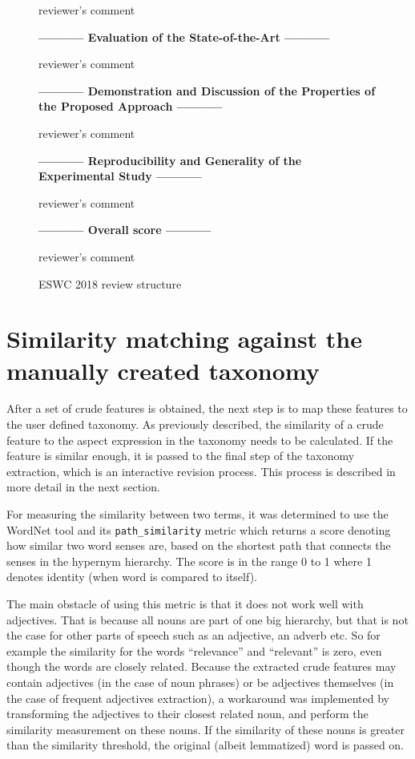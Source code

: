 \begin{figure}[htb]
{\begin{minipage}{0.9\textwidth}
reviewer's comment

\textbf{----------- Evaluation of the State-of-the-Art -----------}

reviewer's comment

\textbf{----------- Demonstration and Discussion of the Properties of the Proposed Approach ----------- }

reviewer's comment

\textbf{----------- Reproducibility and Generality of the Experimental Study ----------- }

reviewer's comment

\textbf{----------- Overall score -----------}

reviewer's comment

\end{minipage}}
\caption{ESWC 2018 review structure}
\label{img:eswc_2018}
\end{figure}

\section{Similarity matching against the manually created taxonomy}
After a set of crude features is obtained, the next step is to map these features to the user defined taxonomy. As previously described, the similarity of a crude feature to the aspect expression in the taxonomy needs to be calculated. If the feature is similar enough, it is passed to the final step of the taxonomy extraction, which is an interactive revision process. This process is described in more detail in the next section.

For measuring the similarity between two terms, it was determined to use the WordNet tool and its \texttt{path\_similarity} metric which returns a score denoting how similar two word senses are, based on the shortest path that connects the senses in the hypernym hierarchy. The score is in the range 0 to 1 where 1 denotes identity (when word is compared to itself). \cite{nltk_ps}

The main obstacle of using this metric is that it does not work well with adjectives. That is because all nouns are part of one big hierarchy, but that is not the case for other parts of speech such as an adjective, an adverb etc. So for example the similarity for the words ``relevance'' and ``relevant'' is zero, even though the words are closely related. Because the extracted crude features may contain adjectives (in the case of noun phrases) or be adjectives themselves (in the case of frequent adjectives extraction),  a workaround was implemented by transforming the adjectives to their closest related noun, and perform the similarity measurement on these nouns. If the similarity of these nouns is greater than the similarity threshold, the original (albeit lemmatized) word is passed on. 

